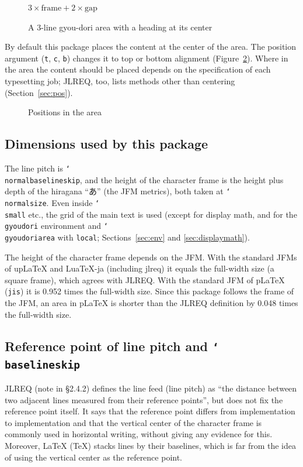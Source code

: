 \documentclass[paper=a4,dvipdfmx]{jlreq}
\newcommand\pkg[1]{\textsf{#1}}
\newcommand\opt[1]{\texttt{#1}}
\newcommand\env[1]{\texttt{#1}}
\newcommand\cs[1]{\texttt{\char`\\#1}}
\begin{document}
\begin{figure}[htbp]
  \centering
    {$3\times\text{frame}+2\times\text{gap}$}
  \caption{A 3-line gyou-dori area with a heading at its center}
  \label{fig:area}
\end{figure}

By default this package places the content at the center of the area. The
position argument (\opt{t}, \opt{c}, \opt{b}) changes it to top or bottom
alignment (Figure~\ref{fig:pos}). Where in the area the content should be placed
depends on the specification of each typesetting job; JLREQ, too, lists methods
other than centering (Section~\ref{sec:pos}).

\begin{figure}[htbp]
  \centering
  \GyFigPos{text}{\opt{t}: top}{\opt{c}: center (default)}{\opt{b}: bottom}
  \caption{Positions in the area}
  \label{fig:pos}
\end{figure}

\subsection{Dimensions used by this package}\label{sec:dims}

The line pitch is \cs{normalbaselineskip}, and the height of the character
frame is the height plus depth of the hiragana ``あ'' (the JFM metrics), both taken
at \cs{normalsize}. Even inside \cs{small} etc., the grid of the main text is
used (except for display math, and for the \env{gyoudori} environment and
\cs{gyoudoriarea} with \opt{local}; Sections~\ref{sec:env} and
\ref{sec:displaymath}).

The height of the character frame depends on the JFM. With the standard JFMs of
upLaTeX and LuaTeX-ja (including \pkg{jlreq}) it equals the full-width size (a
square frame), which agrees with JLREQ. With the standard JFM of pLaTeX
(\texttt{jis}) it is 0.952 times the full-width size. Since this package
follows the frame of the JFM, an area in pLaTeX is shorter than the JLREQ
definition by 0.048 times the full-width size.

\subsection{Reference point of line pitch and \cs{baselineskip}}\label{sec:pitch}

JLREQ (note in \S2.4.2) defines the line feed (line pitch) as ``the distance
between two adjacent lines measured from their reference points'', but does not
fix the reference point itself. It says that the reference point differs from
implementation to implementation and that the vertical center of the character
frame is commonly used in horizontal writing, without giving any evidence for
this. Moreover, \LaTeX{} (\TeX{}) stacks lines by their baselines, which is far
from the idea of using the vertical center as the reference point.
\end{document}
